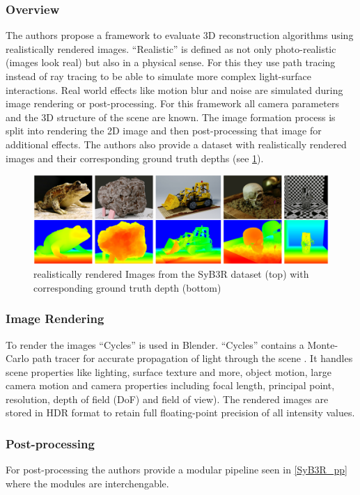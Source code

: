 \documentclass[a4paper,cleardoubleempty,BCOR1cm]{scrbook}
\begin{document}
\subsubsection{Overview}
The authors propose a framework to evaluate 3D reconstruction algorithms using realistically rendered images. ``Realistic'' is defined as not only photo-realistic (images look real) but also in a physical sense. For this they use path tracing instead of ray tracing to be able to simulate more complex light-surface interactions. Real world effects like motion blur and noise are simulated during image rendering or post-processing. For this framework all camera parameters and the 3D structure of the scene are known. The image formation process is split into rendering the 2D image and then post-processing that image for additional effects. The authors also provide a dataset with realistically rendered images and their corresponding ground truth depths (see \ref{SyB3R}).
\begin{figure}[h]
	\centering
	\includegraphics[width=\textwidth]{images/SyB3R.png}
	\caption{realistically rendered Images from the SyB3R dataset (top) with corresponding ground truth depth (bottom)}
	\label{SyB3R}
\end{figure}

\subsubsection{Image Rendering}
To render the images ``Cycles'' is used in Blender. ``Cycles'' contains a Monte-Carlo path tracer for accurate propagation of light through the scene . It handles scene properties like lighting, surface texture and more, object motion, large camera motion and camera properties including focal length, principal point, resolution, depth of field (DoF) and field of view). The rendered images are stored in HDR format to retain full floating-point precision of all intensity values. 

\subsubsection{Post-processing}
For post-processing the authors provide a modular pipeline seen in \ref{SyB3R_pp} where the modules are interchengable.
\end{document}
